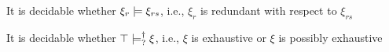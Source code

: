 \begin{thm}
  \label{lem:redundancy-decidability}
  It is decidable whether $\xi_r \models \xi_{rs}$, i.e., $\xi_r$ is redundant with respect to $\xi_{rs}$
\end{thm}

\begin{thm}
  \label{lem:exhaustiveness-decidability}
  It is decidable whether $\top \models_{?}^{\dag} \xi$, i.e., $\xi$ is exhaustive or $\xi$ is possibly exhaustive
\end{thm}

